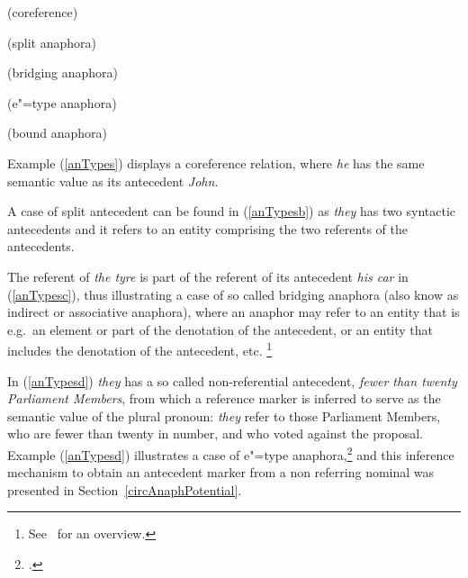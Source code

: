 \documentclass[output=paper
,modfonts
,nonflat]{langsci/langscibook}
\begin{document}
\begin{samepage}
\begin{exe}
\ex

\begin{xlist}

 (coreference)
\label{anTypes}

 (split anaphora)
\label{anTypesb}

 (bridging anaphora)
\label{anTypesc}

 (e"=type anaphora)
\label{anTypesd}

 (bound anaphora)
\label{anTypese}

\end{xlist}
\end{exe}

\end{samepage}

 Example (\ref{anTypes}) displays a coreference relation, where {\it he} has the same semantic value as its antecedent {\it John}. 
 
 A case of split antecedent can be found in (\ref{anTypesb}) as {\it they} has two syntactic antecedents and it refers to an entity comprising the two referents of the antecedents. 
 
 The referent of {\it the tyre} is part of the referent of its antecedent {\it his car} in (\ref{anTypesc}), 
 thus illustrating a case of so called bridging anaphora (also know as indirect or associative anaphora),
where an anaphor may refer to an entity that is e.g.\ an element or part 
of the denotation of the antecedent, or an entity that includes the denotation
of the antecedent, etc.%
\footnote{
See~\citep{poesio:ana98} for an overview.
}
% 

In (\ref{anTypesd}) {\it they} has 
a so called non-referential antecedent, {\it fewer than twenty Parliament Members}, 
from which a reference marker is inferred to serve as the semantic value of the plural pronoun: 
{\it they} refer to those Parliament Members, who are fewer than twenty in number, and who voted against the proposal.
 Example (\ref{anTypesd}) illustrates a case of e"=type anaphora,\footnote{
\citep{evans:pron80}.} and this inference mechanism to obtain an antecedent marker
from a non referring nominal was presented in Section~\ref{circAnaphPotential}. 
\end{document}
